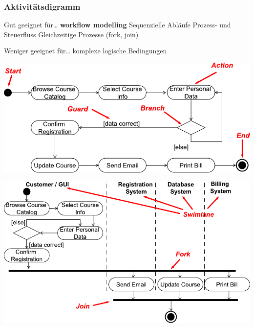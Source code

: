 \subsubsection{Aktivitätsdigramm}

\begin{minipage}[t]{0.48\columnwidth}
    \begin{outline}
        \1 Gut geeignet für\ldots
            \2 \textbf{workflow modelling}
            \2 Sequenzielle Abläufe
            \2 Prozess- und Steuerfluss
            \2 Gleichzeitige Prozesse (fork, join)
    \end{outline}
\end{minipage}
\hfill
\begin{minipage}[t]{0.48\columnwidth}
    \begin{outline}
        \1 Weniger geeignet für\ldots
            \2 komplexe logische Bedingungen
    \end{outline}
\end{minipage}


\begin{center}
    \includegraphics[width=0.8\columnwidth]{images/aktivitaetsdiagramm_elemente.pdf}

    \vspace{0.3cm}

    \includegraphics[width=0.8\columnwidth]{images/aktivitaetsdiagramm_parallelitaet.pdf}
\end{center}

